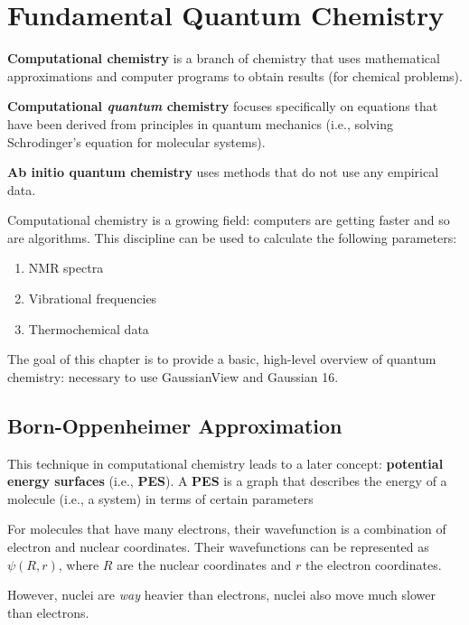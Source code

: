 \documentclass[
  letterpaper,
  DIV=11,
  numbers=noendperiod]{scrreprt}
\providecommand{\tightlist}{%
  \setlength{\itemsep}{0pt}\setlength{\parskip}{0pt}}\usepackage{longtable,booktabs,array}
\begin{document}
\hypertarget{fundamental-quantum-chemistry}{%
\chapter{Fundamental Quantum
Chemistry}\label{fundamental-quantum-chemistry}}

\textbf{Computational chemistry} is a branch of chemistry that uses
mathematical approximations and computer programs to obtain results (for
chemical problems).

\textbf{Computational \emph{quantum} chemistry} focuses specifically on
equations that have been derived from principles in quantum mechanics
(i.e., solving Schrodinger's equation for molecular systems).

\textbf{Ab initio quantum chemistry} uses methods that do not use any
empirical data.

Computational chemistry is a growing field: computers are getting faster
and so are algorithms. This discipline can be used to calculate the
following parameters:

\begin{enumerate}
\def\labelenumi{\arabic{enumi}.}
\tightlist
\item
  NMR spectra
\item
  Vibrational frequencies
\item
  Thermochemical data
\end{enumerate}

The goal of this chapter is to provide a basic, high-level overview of
quantum chemistry: necessary to use GaussianView and Gaussian 16.

\hypertarget{born-oppenheimer-approximation}{%
\section{Born-Oppenheimer
Approximation}\label{born-oppenheimer-approximation}}

This technique in computational chemistry leads to a later concept:
\textbf{potential energy surfaces} (i.e., \textbf{PES}). A \textbf{PES}
is a graph that describes the energy of a molecule (i.e., a system) in
terms of certain parameters

For molecules that have many electrons, their wavefunction is a
combination of electron and nuclear coordinates. Their wavefunctions can
be represented as \(\psi(R, r)\), where \(R\) are the nuclear
coordinates and \(r\) the electron coordinates.

However, nuclei are \emph{way} heavier than electrons, nuclei also move
much slower than electrons.
\end{document}
